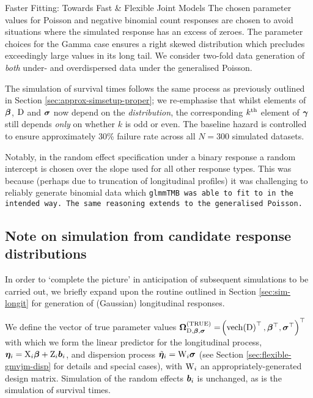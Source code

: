 \begin{chapter}{\label{cha:flexible}Faster Fitting: Towards Fast \& Flexible Joint Models}
The chosen parameter values for Poisson and negative binomial count responses are chosen to avoid situations where the simulated response has an excess of zeroes. The parameter choices for the Gamma case ensures a right skewed distribution which precludes exceedingly large values in its long tail. We consider two-fold data generation of \textit{both} under- and overdispersed data under the generalised Poisson.

The simulation of survival times follows the same process as previously outlined in Section \ref{sec:approx-simsetup-proper}; we re-emphasise that whilst elements of $\bm{\beta}$, $\mathrm{D}$ and $\bm{\sigma}$ now depend on the \textit{distribution}, the corresponding $k^{\text{th}}$ element of $\bm{\gamma}$ still depends \textit{only} on whether $k$ is odd or even. The baseline hazard is controlled to ensure approximately 30\% failure rate across all $N=300$ simulated datasets.

\begin{remark}
    Notably, in the random effect specification under a binary response a random intercept is chosen over the slope used for all other response types. This was because (perhaps due to truncation of longitudinal profiles) it was challenging to reliably generate binomial data which \tt{glmmTMB} was able to fit to in the intended way. The same reasoning extends to the generalised Poisson.
\end{remark}

\subsection{Note on simulation from candidate response distributions}\label{sec:flexible-sim-long}
In order to `complete the picture' in anticipation of subsequent simulations to be carried out, we briefly expand upon the routine outlined in Section \ref{sec:sim-longit} for generation of (Gaussian) longitudinal responses. 

We define the vector of true parameter values $\bm{\mathrm{\Omega}}_{\mathrm{D},\bm{\beta},\bm{\sigma}}^{(\mathrm{TRUE})}=\!\left(\text{vech}\!\left(\mathrm{D}\right)^\top,\bm{\beta}^\top,\bm{\sigma}^\top\right)^\top$ with which we form the linear predictor for the longitudinal process, $\bm{\eta}_i=\mathrm{X}_i\bm{\beta}+\mathrm{Z}_i\bm{b}_i$, and dispersion process $\tilde{\bm{\eta}}_{i}=\mathrm{W}_i\bm{\sigma}$ (see Section \ref{sec:flexible-gmvjm-disp} for details and special cases), with $\mathrm{W}_i$ an appropriately-generated design matrix. Simulation of the random effects $\bm{b}_i$ is unchanged, as is the simulation of survival times. 


\end{chapter}
